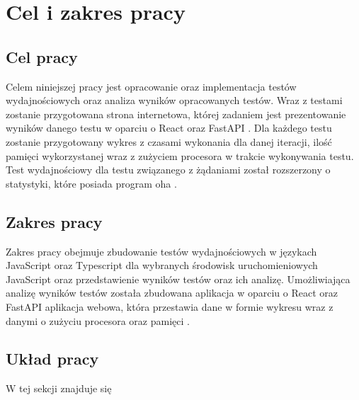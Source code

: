 \section*{Cel i zakres pracy}

\subsection*{Cel pracy}
Celem niniejszej pracy jest opracowanie oraz implementacja testów wydajnościowych oraz analiza wyników opracowanych testów. Wraz z testami zostanie przygotowana strona internetowa, której zadaniem jest prezentowanie wyników danego testu w oparciu o React \cite{React} oraz FastAPI \cite{FastAPI}. Dla każdego testu zostanie przygotowany wykres z czasami wykonania dla danej iteracji, ilość pamięci wykorzystanej wraz z zużyciem procesora w trakcie wykonywania testu. Test wydajnościowy dla testu związanego z żądaniami  został rozszerzony o statystyki, które posiada program oha \cite{oha}.

\subsection*{Zakres pracy}
Zakres pracy obejmuje zbudowanie testów wydajnościowych w językach JavaScript oraz Typescript dla wybranych środowisk uruchomieniowych JavaScript oraz przedstawienie wyników testów oraz ich analizę. Umożliwiająca analizę wyników testów została zbudowana aplikacja w oparciu o React \cite{React} oraz FastAPI \cite{FastAPI} aplikacja webowa, która przestawia dane w formie wykresu wraz z danymi o zużyciu procesora oraz pamięci .

\subsection*{Układ pracy}
W tej sekcji znajduje się